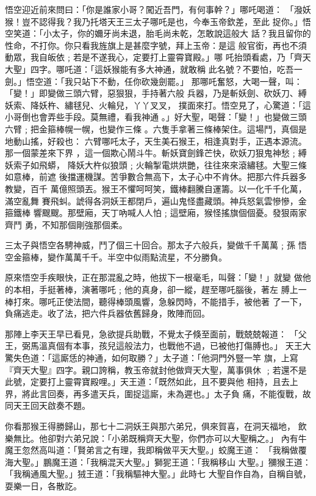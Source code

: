 \begin{pinyinscope}
{悟空迎近前來問曰：「你是誰家小哥？闖近吾門，有何事幹？」哪吒喝道：
「潑妖猴！豈不認得我？我乃托塔天王三太子哪吒是也，今奉玉帝欽差，至此
捉你。」悟空笑道：「小太子，你的嬭牙尚未退，胎毛尚未乾，怎敢說這般大
話？我且留你的性命，不打你。你只看我旌旗上是甚麼字號，拜上玉帝：是這
般官銜，再也不須動眾，我自皈依﹔若是不遂我心，定要打上靈霄寶殿。」哪
吒抬頭看處，乃「齊天大聖」四字。哪吒道：「這妖猴能有多大神通，就敢稱
此名號？不要怕，吃吾一劍。」悟空道：「我只站下不動，任你砍幾劍罷。」
那哪吒奮怒，大喝一聲，叫：「變！」即變做三頭六臂，惡狠狠，手持著六般
兵器，乃是斬妖劍、砍妖刀、縛妖索、降妖杵、繡毬兒、火輪兒，丫丫叉叉，
撲面來打。悟空見了，心驚道：「這小哥倒也會弄些手段。莫無禮，看我神通
。」好大聖，喝聲：「變！」也變做三頭六臂﹔把金箍棒幌一幌，也變作三條
。六隻手拿著三條棒架住。這場鬥，真個是地動山搖，好殺也：
六臂哪吒太子，天生美石猴王，相逢真對手，正遇本源流。那一個蒙差來下界
，這一個欺心鬧斗牛。斬妖寶劍鋒芒快，砍妖刀狠鬼神愁﹔縛妖索子如飛蟒，
降妖大杵似狼頭﹔火輪掣電烘烘艷，往往來來滾繡毬。大聖三條如意棒，前遮
後擋運機謀。苦爭數合無高下，太子心中不肯休。把那六件兵器多教變，百千
萬億照頭丟。猴王不懼呵呵笑，鐵棒翻騰自運籌。以一化千千化萬，滿空亂舞
賽飛虯。諕得各洞妖王都閉戶，遍山鬼怪盡藏頭。神兵怒氣雲慘慘，金箍鐵棒
響颼颼。那壁廂，天丁吶喊人人怕﹔這壁廂，猴怪搖旗個個憂。發狠兩家齊鬥
勇，不知那個剛強那個柔。

三太子與悟空各騁神威，鬥了個三十回合。那太子六般兵，變做千千萬萬﹔孫
悟空金箍棒，變作萬萬千千。半空中似雨點流星，不分勝負。

原來悟空手疾眼快，正在那混亂之時，他拔下一根毫毛，叫聲：「變！」就變
做他的本相，手挺著棒，演著哪吒﹔他的真身，卻一縱，趕至哪吒腦後，著左
膊上一棒打來。哪吒正使法間，聽得棒頭風響，急躲閃時，不能措手，被他著
了一下，負痛逃走。收了法，把六件兵器依舊歸身，敗陣而回。

那陣上李天王早已看見，急欲提兵助戰，不覺太子倏至面前，戰兢兢報道：
「父王，弼馬溫真個有本事，孩兒這般法力，也戰他不過，已被他打傷膊也。」
天王大驚失色道：「這廝恁的神通，如何取勝？」太子道：「他洞門外豎一竿
旗，上寫『齊天大聖』四字。親口誇稱，教玉帝就封他做齊天大聖，萬事俱休
﹔若還不是此號，定要打上靈霄寶殿哩。」天王道：「既然如此，且不要與他
相持，且去上界，將此言回奏，再多遣天兵，圍捉這廝，未為遲也。」太子負
痛，不能復戰，故同天王回天啟奏不題。

你看那猴王得勝歸山，那七十二洞妖王與那六弟兄，俱來賀喜，在洞天福地，
飲樂無比。他卻對六弟兄說：「小弟既稱齊天大聖，你們亦可以大聖稱之。」
內有牛魔王忽然高叫道：「賢弟言之有理，我即稱做平天大聖。」蛟魔王道：
「我稱做覆海大聖。」鵬魔王道：「我稱混天大聖。」獅狔王道：「我稱移山
大聖。」獼猴王道：「我稱通風大聖。」狨王道：「我稱驅神大聖。」此時七
大聖自作自為，自稱自號，耍樂一日，各散訖。

}
\end{pinyinscope}
